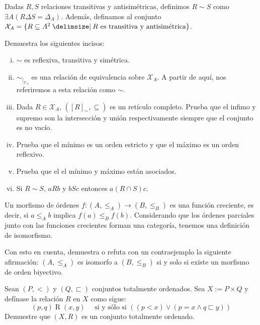 \begin{exercise}[parzfc=2]
  Dadas $R,S$ relaciones transitivas y antisimétricas, definimos $R\sim S$ como ${\exists A (R\Delta S = \Delta_A)}$. Además, definamos al conjunto $\mathcal{X}_A=\set{R\subseteq A^2\st R \text{ es transitiva y antisimétrica}}$.
  
  Demuestra los siguientes incisos:
  \begin{enumerate}[i)]
      \item $\sim$ es reflexiva, transitiva y simétrica.
      \item $\sim_{|_{\mathcal{X}_A}}$ es una relación de equivalencia sobre $\mathcal{X}_A$. A partir de aquí, nos referiremos a esta relación como $\sim$.
      \item Dada $R\in \mathcal{X}_A$, $([R]_\sim, \subseteq)$ es un retículo completo. Prueba que el infimo y supremo son la intersección y unión respectivamente siempre que el conjunto es no vacío.
      \item Prueba que el mínimo es un orden estricto y que el máximo es un orden reflexivo.
      \item Prueba que el el mínimo y máximo están asociados.
      \item Si $R\sim S$, $aRb$ y $bSc$ entonces $a(R\cap S) c$.
  \end{enumerate}
  
\end{exercise}

\begin{exercise}
  Un morfismo de órdenes $f\colon (A,\leq_A)\to (B,\leq_B)$ es una función creciente, es decir, si $a\leq_A b$ implica $f(a)\leq_B f(b)$. Considerando que los órdenes parciales junto con las funciones crecientes forman una categoría, tenemos una definición de isomorfismo.

  Con esto en cuenta, demuestra o refuta con un contraejemplo la siguiente afirmación: $(A,\leq_A)$ es isomorfo a $(B,\leq_B)$ si y solo si existe un morfismo de orden biyectivo.
\end{exercise}

\begin{exercise}[parzfc=2]
  Sean $(P,<)$ y $(Q,\sqsubset)$ conjuntos totalmente ordenados. Sea $X:=P \times Q$ y defínase la relación $R$ en $X$ como sigue:
  \[ (p,q) \mathrel{R} (x,y) \quad \text{ si y sólo si } \left( \left( p < x \right) \lor \left( p=x \land q \sqsubset y \right) \right) \]
  Demuestre que $(X,R)$ es un conjunto totalmente ordenado.
\end{exercise}

